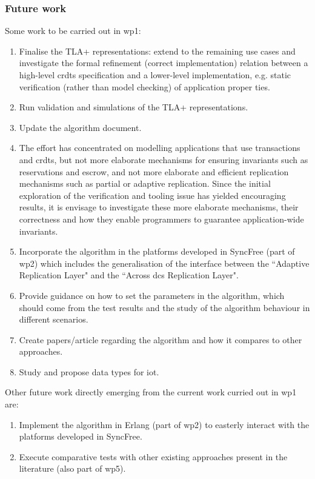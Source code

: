 \documentclass[12pt,twoside]{article}
\begin{document}
\subsubsection{Future work}
Some work to be carried out in \gls{wp1}:
\begin{enumerate}
	\item Finalise the TLA+ representations: extend to the remaining use cases and investigate the formal refinement (correct implementation) relation between a high-level \glspl{crdt} specification and a lower-level implementation, e.g. static verification (rather than model checking) of application proper ties.

	\item Run validation and simulations of the TLA+ representations.

	\item Update the algorithm document.

	\item The effort has concentrated on modelling applications that use transactions and \glspl{crdt}, but not more elaborate mechanisms for ensuring invariants such as reservations and escrow, and not more elaborate and efficient replication mechanisms such as partial or adaptive replication. Since the initial exploration of the verification and tooling issue has yielded encouraging results, it is envisage to investigate these more elaborate mechanisms, their correctness and how they enable programmers to guarantee application-wide invariants.

	\item Incorporate the algorithm in the platforms developed in SyncFree (part of \gls{wp2}) which includes the generalisation of the interface between the ``Adaptive Replication Layer" and the ``Across \glspl{dc} Replication Layer".

	\item Provide guidance on how to set the parameters in the algorithm, which should come from the test results and the study of the algorithm behaviour in different scenarios.

	\item Create papers/article regarding the algorithm and how it compares to other approaches.
	
	\item Study and propose data types for \gls{iot}.
\end{enumerate}

Other future work directly emerging from the current work curried out in \gls{wp1} are:
\begin{enumerate}
	\item Implement the algorithm in Erlang (part of \gls{wp2}) to easterly interact with the platforms developed in SyncFree.

	\item Execute comparative tests with other existing approaches present in the literature (also part of \gls{wp5}).
\end{enumerate}
	
\end{document}
